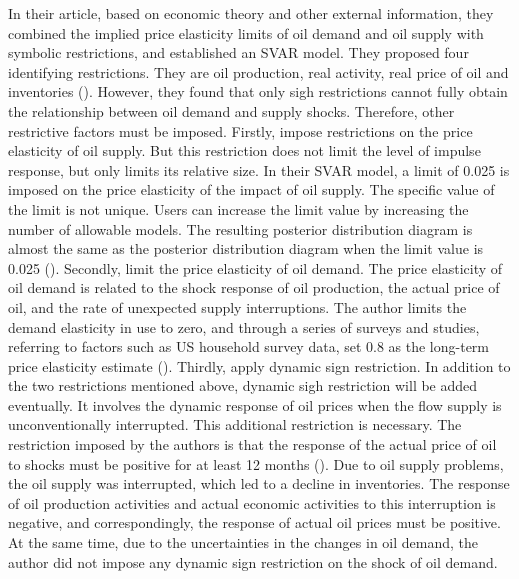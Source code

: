 In their article, based on economic theory and other external information, they combined the implied price elasticity limits of oil demand and oil supply with symbolic restrictions, and established an SVAR model. They proposed four identifying restrictions. They are oil production, real activity, real price of oil and inventories (\cite{kilian2014role}). However, they found that only sigh restrictions cannot fully obtain the relationship between oil demand and supply shocks. Therefore, other restrictive factors must be imposed. Firstly, impose restrictions on the price elasticity of oil supply. But this restriction does not limit the level of impulse response, but only limits its relative size. In their SVAR model, a limit of 0.025 is imposed on the price elasticity of the impact of oil supply. The specific value of the limit is not unique. Users can increase the limit value by increasing the number of allowable models. The resulting posterior distribution diagram is almost the same as the posterior distribution diagram when the limit value is 0.025 (\cite{kilian2014role}). Secondly, limit the price elasticity of oil demand. The price elasticity of oil demand is related to the shock response of oil production, the actual price of oil, and the rate of unexpected supply interruptions. The author limits the demand elasticity in use to zero, and through a series of surveys and studies, referring to factors such as US household survey data, set 0.8 as the long-term price elasticity estimate (\cite{kilian2014role}). Thirdly, apply dynamic sign restriction. In addition to the two restrictions mentioned above, dynamic sigh restriction will be added eventually. It involves the dynamic response of oil prices when the flow supply is unconventionally interrupted. This additional restriction is necessary.  The restriction imposed by the authors is that the response of the actual price of oil to shocks must be positive for at least 12 months (\cite{kilian2014role}). Due to oil supply problems, the oil supply was interrupted, which led to a decline in inventories. The response of oil production activities and actual economic activities to this interruption is negative, and correspondingly, the response of actual oil prices must be positive.  At the same time, due to the uncertainties in the changes in oil demand, the author did not impose any dynamic sign restriction on the shock of oil demand.



